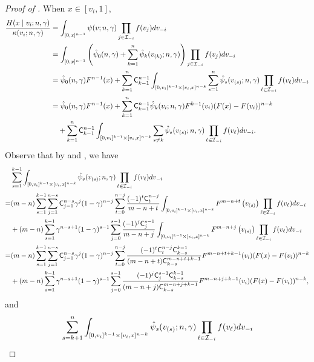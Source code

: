 \begin{proof}[Proof of ]
\noindent When $x\in [v_i,1]$,
\begin{align*}
    \frac{H(x\mid v_i;n,\gamma)}{\kappa(v_i;n,\gamma)} &=   
 \int_{[0,x]^{n-1}}
\psi(v;n,\gamma)\prod_{j\in \mathcal{I}_{-i}} f(v_j) 
dv_{-i}\\
& = \int_{[0,x]^{n-1}}
\left(\hat{\psi}_0(n,\gamma)+\sum_{k=1}^n \hat{\psi}_k(v_{(k)};n,\gamma)\right)\prod_{j\in \mathcal{I}_{-i}} f(v_j)dv_{-i}\\
& = \hat{\psi}_0(n,\gamma)F^{n-1}(x) + \sum_{k=1}^{n}\mathsf{C}^{n-1}_{k-1}\int_{[0,v_i]^{k-1}\times [v_i,x]^{n-k}}
\sum_{s=1}^n \hat{\psi}_s(v_{(s)};n,\gamma)\prod_{\ell\in \mathcal{I}_{-i}} f(v_{\ell})dv_{-i}\\
& = \hat{\psi}_0(n,\gamma)F^{n-1}(x) + \sum_{k=1}^n \mathsf{C}^{n-1}_{k-1}\hat{\psi}_k(v_{i};n,\gamma)F^{k-1}(v_i)(F(x) - F(v_i))^{n-k}\\
& \quad + \sum_{k=1}^{n}\mathsf{C}^{n-1}_{k-1}\int_{[0,v_i]^{k-1}\times [v_i,x]^{n-k}}
\sum_{s\neq k} \hat{\psi}_s(v_{(s)};n,\gamma)\prod_{\ell\in \mathcal{I}_{-i}} f(v_{\ell})dv_{-i}.
\end{align*}
Observe that by  and , we have 
\begin{align*}
&\sum_{s= 1}^{k-1}\int_{[0,v_i]^{k-1}\times [v_i,x]^{n-k}} \hat{\psi}_s(v_{(s)};n,\gamma)\prod_{\ell\in \mathcal{I}_{-i}} f(v_{\ell})dv_{-i}  \\
=&(m-n) \sum_{s=1}^{k-1}\sum_{j=1}^{n-s} \mathsf{C}^{n-s}_{j-1}\gamma^j
 (1-\gamma)^{n-j}\sum_{t=0}^{n-j}\frac{(-1)^{t}\mathsf{C}^{n-j}_t}{m-n+t} \int_{[0,v_i]^{k-1}\times [v_i,x]^{n-k}} F^{m-n+t}\left(v_{(s)}\right)\prod_{\ell\in \mathcal{I}_{-i}} f(v_{\ell})dv_{-i} \\
 &+ (m-n) \sum_{s=1}^{k-1}\gamma^{n-s+1}
 (1-\gamma)^{s-1}\sum_{j=0}^{s-1}\frac{(-1)^{j}\mathsf{C}^{s-1}_j}{m-n+j}\int_{[0,v_i]^{k-1}\times [v_i,x]^{n-k}} F^{m-n+j}\left(v_{(s)}\right)\prod_{\ell\in \mathcal{I}_{-i}} f(v_{\ell})dv_{-i}\\
 =& (m-n) \sum_{s=1}^{k-1}\sum_{j=1}^{n-s} \mathsf{C}^{n-s}_{j-1}\gamma^j
 (1-\gamma)^{n-j}\sum_{t=0}^{n-j}\frac{(-1)^{t}\mathsf{C}^{n-j}_t\mathsf{C}^{k-1}_{k-s}}{(m-n+t)\mathsf{C}^{m-n+t+k-1}_{k-s}}F^{m-n+t+k-1}(v_i)(F(x) - F(v_i))^{n-k}\\
 & + (m-n) \sum_{s=1}^{k-1}\gamma^{n-s+1}
 (1-\gamma)^{s-1}\sum_{j=0}^{s-1}\frac{(-1)^{j}\mathsf{C}^{s-1}_j\mathsf{C}^{k-1}_{k-s}}{(m-n+j)\mathsf{C}^{m-n+j+k-1}_{k-s}}F^{m-n+j+k-1}(v_i)(F(x) - F(v_i))^{n-k},
\end{align*}
and 
{\small
\begin{align*}
&\sum_{s= k+1}^{n}\int_{[0,v_i]^{k-1}\times [v_i,x]^{n-k}} \hat{\psi}_s(v_{(s)};n,\gamma)\prod_{\ell\in \I_{-i}} f(v_{\ell})dv_{-i}  \\

\end{align*}}
\end{proof}
